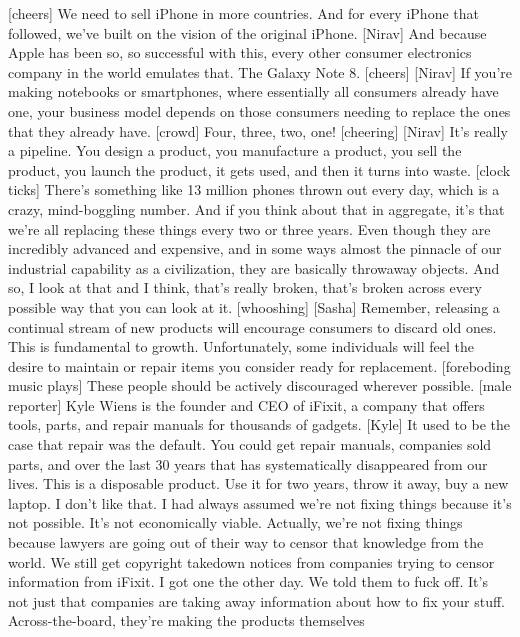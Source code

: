 \documentclass[a4paper]{article}
\begin{document}
	[cheers]
	We need to sell iPhone in more countries.
	And for every iPhone that followed,
	we've built on the vision of the original iPhone.
	[Nirav] And because Apple has been
	so, so successful with this,
	every other consumer electronics company in the world
	emulates that.
	The Galaxy Note 8.
	[cheers]
	[Nirav] If you're making notebooks or smartphones,
	where essentially all consumers already have one,
	your business model depends on
	those consumers needing to replace the ones that they already have.
	[crowd] Four, three, two, one!
	[cheering]
	[Nirav] It's really a pipeline. You design a product,
	you manufacture a product, you sell the product,
	you launch the product,
	it gets used,
	and then it turns into waste.
	[clock ticks]
	There's something like
	13 million phones thrown out every day, which is a crazy, mind-boggling number.
	And if you think about that in aggregate,
	it's that we're all replacing these things every two or three years.
	Even though they are incredibly advanced and expensive,
	and in some ways almost the pinnacle of
	our industrial capability as a civilization,
	they are basically throwaway objects.
	And so, I look at that and I think,
	that's really broken, that's broken across every possible way
	that you can look at it.
	[whooshing]
	[Sasha] Remember,
	releasing a continual stream of new products will encourage consumers
	to discard old ones.
	This is fundamental to growth.
	Unfortunately, some individuals will feel the desire to maintain
	or repair items you consider ready for replacement.
	[foreboding music plays]
	These people should be actively discouraged wherever possible.
	[male reporter] Kyle Wiens is the founder and CEO of iFixit,
	a company that offers tools, parts, and repair manuals
	for thousands of gadgets.
	[Kyle] It used to be the case that repair was the default.
	You could get repair manuals, companies sold parts,
	and over the last 30 years that has systematically disappeared from our lives.
	This is a disposable product.
	Use it for two years, throw it away, buy a new laptop.
	I don't like that.
	I had always assumed we're not fixing things because it's not possible.
	It's not economically viable.
	Actually, we're not fixing things because lawyers are going out of their way
	to censor that knowledge from the world.
	We still get copyright takedown notices
	from companies trying to censor information from iFixit.
	I got one the other day.
	We told them to fuck off.
	It's not just that companies are taking away information
	about how to fix your stuff.
	Across-the-board, they're making the products themselves
\end{document}
